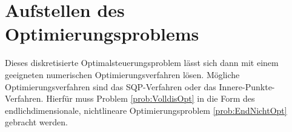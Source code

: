 %

\section{Aufstellen des Optimierungsproblems}
Dieses diskretisierte Optimalsteuerungsproblem lässt sich dann mit einem geeigneten numerischen Optimierungsverfahren lösen. Mögliche Optimierungsverfahren sind das SQP-Verfahren oder das Innere-Punkte-Verfahren. Hierfür muss Problem \ref{prob:VolldisOpt} in die Form des endlichdimensionale, nichtlineare Optimierungsproblem \ref{prob:EndNichtOpt} gebracht werden.

